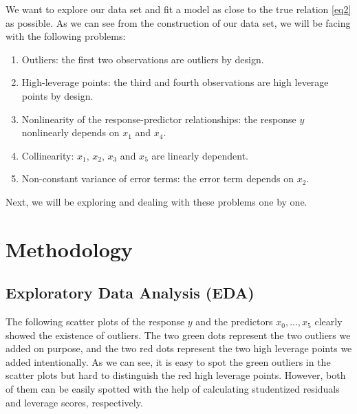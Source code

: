\documentclass{article}
\begin{document}
We want to explore our data set and fit a model as close to the true relation \eqref{eq2} as possible. As we can see from the construction of our data set, we will be facing with the following problems:
\begin{enumerate}
\item Outliers: the first two observations are outliers by design. 
\item High-leverage points: the third and fourth observations are high leverage points by design.
\item Nonlinearity of the response-predictor relationships: the response $y$ nonlinearly depends on $x_1$ and $x_4$.
\item Collinearity: $x_1$, $x_2$, $x_3$ and $x_5$ are linearly dependent. 
\item Non-constant variance of error terms: the error term depends on $x_2$.
\end{enumerate}

Next, we will be exploring and dealing with these problems one by one.


\section{Methodology}
\subsection{Exploratory Data Analysis (EDA)}
The following scatter plots of the response $y$ and the predictors $x_0,..., x_5$ clearly showed the existence of outliers. The two green dots represent the two outliers we added on purpose, and the two red dots represent the two high leverage points we added intentionally. As we can see, it is easy to spot the green outliers in the scatter plots but hard to distinguish the red high leverage points. However, both of them can be easily spotted with the help of calculating studentized residuals and leverage scores, respectively. 
\end{document}
